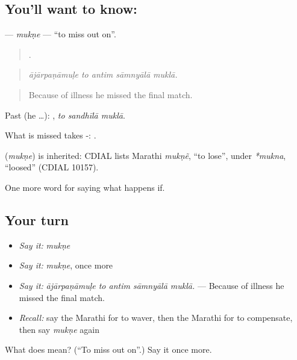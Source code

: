 \subsection*{You'll want to know: }
\textbf{} — \emph{mukṇe} — \textquotedblleft{}to miss out on\textquotedblright{}.

\begin{quote}
    .
\end{quote}

\begin{quote}
\emph{ājārpaṇāmuḷe to antim sāmnyālā muklā.}
\end{quote}

\begin{quote}
Because of illness he missed the final match.
\end{quote}

Past (he …):   , \emph{to sandhīlā muklā}.

What is missed takes -:  .

\begin{cousinweb}
\textbf{} (\emph{mukṇe}) is inherited: CDIAL lists Marathi \emph{mukṇẽ}, \textquotedblleft{}to lose\textquotedblright{}, under \emph{*mukna}, \textquotedblleft{}loosed\textquotedblright{} (CDIAL 10157).
\end{cousinweb}

\begin{grammarlens}[title={What you've built}]
One more word for saying what happens if.
\end{grammarlens}

\subsection*{Your turn}
\begin{itemize}
\raggedright
  \item \emph{Say it:} \emph{mukṇe}
  \item \emph{Say it:} \emph{mukṇe}, once more
  \item \emph{Say it:} \emph{ājārpaṇāmuḷe to antim sāmnyālā muklā.} — Because of illness he missed the final match.
  \item \emph{Recall:} say the Marathi for to waver, then the Marathi for to compensate, then say \emph{mukṇe} again
\end{itemize}

\begin{tcolorbox}[breakable,colback=teal!4,colframe=teal!35!black,title={Before you move on}]
What does  mean? (\textquotedblleft{}To miss out on\textquotedblright{}.) Say it once more.
\end{tcolorbox}

